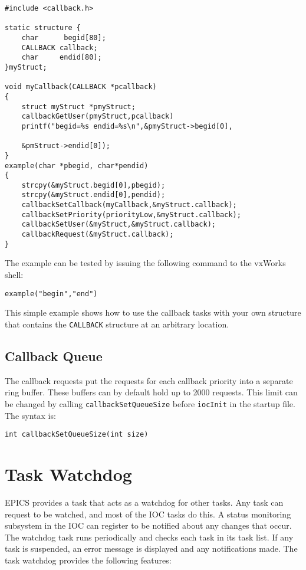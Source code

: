\begin{verbatim}
#include <callback.h>

static structure {
    char      begid[80];
    CALLBACK callback;
    char     endid[80];
}myStruct;

void myCallback(CALLBACK *pcallback)
{
    struct myStruct *pmyStruct;
    callbackGetUser(pmyStruct,pcallback)
    printf("begid=%s endid=%s\n",&pmyStruct->begid[0],

    &pmStruct->endid[0]);
}
example(char *pbegid, char*pendid)
{
    strcpy(&myStruct.begid[0],pbegid);
    strcpy(&myStruct.endid[0],pendid);
    callbackSetCallback(myCallback,&myStruct.callback);
    callbackSetPriority(priorityLow,&myStruct.callback);
    callbackSetUser(&myStruct,&myStruct.callback);
    callbackRequest(&myStruct.callback);
}
\end{verbatim}

The example can be tested by issuing the following command to the vxWorks shell:

\begin{verbatim}
example("begin","end")
\end{verbatim}

This simple example shows how to use the callback tasks with your own structure that contains the \verb|CALLBACK| structure 
at an arbitrary location.

\subsection{Callback Queue}

The callback requests put the requests for each callback priority into a separate ring buffer. These buffers can by default 
hold up to 2000 requests. This limit can be changed by calling \verb|callbackSetQueueSize| before \verb|iocInit| in the 
startup file. The syntax is:

\begin{verbatim}
int callbackSetQueueSize(int size)
\end{verbatim}

\section{Task Watchdog}
\label{Task Watchdog}

EPICS provides a task that acts as a watchdog for other tasks. Any task can request to be watched, and most of the IOC 
tasks do this. A status monitoring subsystem in the IOC can register to be notified about any changes that occur. The 
watchdog task runs periodically and checks each task in its task list. If any task is suspended, an error message is 
displayed and any notifications made. The task watchdog provides the following features:

